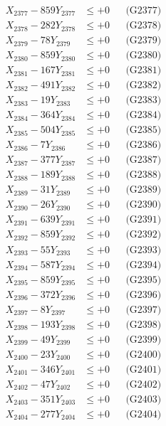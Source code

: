 \documentclass[a4paper,10pt]{article}
\begin{document}
{\begin{align}
X_{2377} - 859Y_{2377} &\leq +0 && \text{(G2377)} \\
X_{2378} - 282Y_{2378} &\leq +0 && \text{(G2378)} \\
X_{2379} - 78Y_{2379} &\leq +0 && \text{(G2379)} \\
X_{2380} - 859Y_{2380} &\leq +0 && \text{(G2380)} \\
\allowbreak
X_{2381} - 167Y_{2381} &\leq +0 && \text{(G2381)} \\
X_{2382} - 491Y_{2382} &\leq +0 && \text{(G2382)} \\
X_{2383} - 19Y_{2383} &\leq +0 && \text{(G2383)} \\
X_{2384} - 364Y_{2384} &\leq +0 && \text{(G2384)} \\
X_{2385} - 504Y_{2385} &\leq +0 && \text{(G2385)} \\
X_{2386} - 7Y_{2386} &\leq +0 && \text{(G2386)} \\
X_{2387} - 377Y_{2387} &\leq +0 && \text{(G2387)} \\
X_{2388} - 189Y_{2388} &\leq +0 && \text{(G2388)} \\
X_{2389} - 31Y_{2389} &\leq +0 && \text{(G2389)} \\
X_{2390} - 26Y_{2390} &\leq +0 && \text{(G2390)} \\
\allowbreak
X_{2391} - 639Y_{2391} &\leq +0 && \text{(G2391)} \\
X_{2392} - 859Y_{2392} &\leq +0 && \text{(G2392)} \\
X_{2393} - 55Y_{2393} &\leq +0 && \text{(G2393)} \\
X_{2394} - 587Y_{2394} &\leq +0 && \text{(G2394)} \\
X_{2395} - 859Y_{2395} &\leq +0 && \text{(G2395)} \\
X_{2396} - 372Y_{2396} &\leq +0 && \text{(G2396)} \\
X_{2397} - 8Y_{2397} &\leq +0 && \text{(G2397)} \\
X_{2398} - 193Y_{2398} &\leq +0 && \text{(G2398)} \\
X_{2399} - 49Y_{2399} &\leq +0 && \text{(G2399)} \\
X_{2400} - 23Y_{2400} &\leq +0 && \text{(G2400)} \\
\allowbreak
X_{2401} - 346Y_{2401} &\leq +0 && \text{(G2401)} \\
X_{2402} - 47Y_{2402} &\leq +0 && \text{(G2402)} \\
X_{2403} - 351Y_{2403} &\leq +0 && \text{(G2403)} \\
X_{2404} - 277Y_{2404} &\leq +0 && \text{(G2404)} \\

\end{align}}
\end{document}
